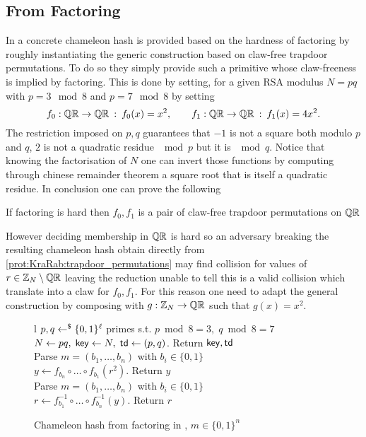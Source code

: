 \subsection{From Factoring}
In \cite{NDSS:KraRab00} a concrete chameleon hash is provided based on the hardness of factoring by roughly instantiating the generic construction based on claw-free trapdoor permutations.
To do so they simply provide such a primitive whose claw-freeness is implied by factoring.
This is done by setting, for a given RSA modulus $N = pq$ with $p = 3 \mod 8$ and $p = 7 \mod 8$ by setting
\[	
	f_0 : \mathbb{Q}\mathbb{R} \to \mathbb{Q}\mathbb{R}
		\: : \:
	f_0(x) = x^2,
		\qquad
	f_1 : \mathbb{Q}\mathbb{R} \to \mathbb{Q}\mathbb{R}
		\: : \:
	f_1(x) = 4 x^2.
\]
The restriction imposed on $p, q$ guarantees that $-1$ is not a square both modulo $p$ and $q$, $2$ is not a quadratic residue $\mod p$ but it is $\mod q$.
Notice that knowing the factorisation of $N$ one can invert those functions by computing through chinese remainder theorem a square root that is itself a quadratic residue.
In conclusion one can prove the following

\begin{proposition}
	If factoring is hard then $f_0, f_1$ is a pair of claw-free trapdoor permutations on $\mathbb{Q}\mathbb{R}$
\end{proposition}

However deciding membership in $\mathbb{Q}\mathbb{R}$ is hard so an adversary breaking the resulting chameleon hash obtain directly from \ref{prot:KraRab:trapdoor_permutations} may find collision for values of $r \in \mathbb{Z}_N \setminus \mathbb{Q}\mathbb{R}$ leaving the reduction unable to tell this is a valid collision which translate into a claw for $f_0, f_1$.
For this reason one need to adapt the general construction by composing with $g : \mathbb{Z}_N \to \mathbb{Q}\mathbb{R}$ such that $g(x) = x^2$.

\begin{figure}[htb]
\centering
\begin{pcarray}{l}
		{
			$p, q \gets^{\$} \{0, 1\}^\ell$ primes s.t. $p \bmod 8 = 3, \; q \bmod 8 = 7$
				\\
			$N \gets pq, \; \mathsf{key} \gets N, \; \mathsf{td} \gets (p, q)$. Return $\mathsf{key}, \mathsf{td}$
		}
		\\
		{
			Parse $m = (b_1, \ldots, b_n)$ with $b_i \in \{0, 1\}$
				\\
			$y \gets f_{b_n} \circ \ldots \circ f_{b_1} (r^2)$. Return $y$
		}
		\\
		{
			Parse $m = (b_1, \ldots, b_n)$ with $b_i \in \{0, 1\}$
				\\
			$r \gets f_{b_1}^{-1} \circ \ldots \circ f_{b_n}^{-1}(y)$. Return $r$
		}
\end{pcarray}
\caption{Chameleon hash from factoring in \cite{NDSS:KraRab00}, $m \in \{0, 1\}^n$}
\label{prot:KraRab:factoring}
\end{figure}

